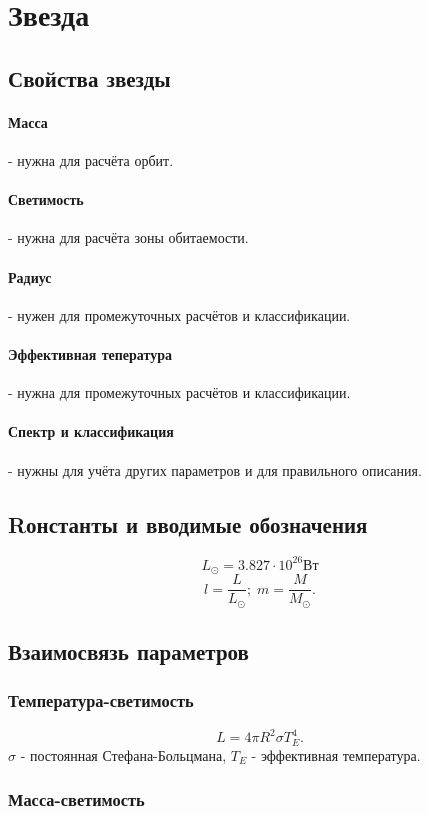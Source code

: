 \section{Звезда}
\subsection{Свойства звезды}
\paragraph{Масса} - нужна для расчёта орбит.
\paragraph{Светимость} - нужна для расчёта зоны обитаемости.
\paragraph{Радиус} - нужен для промежуточных расчётов и классификации.
\paragraph{Эффективная тепература} - нужна для промежуточных расчётов и классификации.
\paragraph{Спектр и классификация} - нужны для учёта других параметров и для правильного описания.

\subsection{Rонстанты и вводимые обозначения}
$$L_\odot = 3.827\cdot 10^{26} \mbox{Вт}$$
$$l=\frac{L}{L_\odot};\; m=\frac{M}{M_\odot}.$$
\subsection{Взаимосвязь параметров}


\subsubsection{Температура-светимость}
\begin{equation}
L=4\pi R^2\sigma T_E^4.
\end{equation}
$\sigma$ - постоянная Стефана-Больцмана,
$T_E$ - эффективная температура.

\subsubsection{Масса-светимость}

